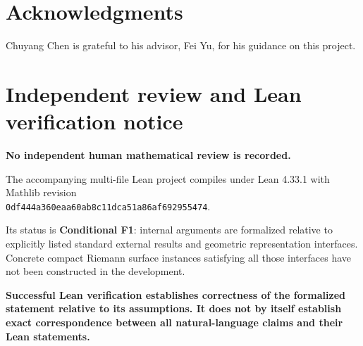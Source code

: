 \documentclass[11pt]{article}
\theoremstyle{remark}
\begin{document}
\section*{Acknowledgments}
Chuyang Chen is grateful to his advisor, Fei Yu, for his guidance on this project.

\section*{Independent review and Lean verification notice}
\begingroup
\small\sloppy
\begin{center}
\begin{minipage}{0.94\linewidth}
\centering
\textbf{\large No independent human mathematical review is recorded.}
\end{minipage}
\end{center}
\par\medskip
\noindent The accompanying multi-file Lean project compiles under Lean 4.33.1 with Mathlib revision\\
\texttt{0df444a360eaa60ab8c11dca51a86af692955474}.
\par\medskip
\noindent Its status is \textbf{Conditional F1}: internal arguments are formalized relative to explicitly listed
standard external results and geometric representation interfaces. Concrete compact Riemann surface instances satisfying all those interfaces have not been constructed in the development.
\par\medskip
\noindent\textbf{Successful Lean verification establishes correctness of the formalized statement relative to its assumptions. It does not by itself establish exact correspondence between all natural-language claims and their Lean statements.}
\endgroup
\end{document}
